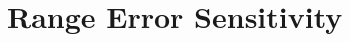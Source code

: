 \documentclass[journal]{IEEEtran}
\begin{document}
\section{Range Error Sensitivity}
\label{sec_sim}
\end{document}
